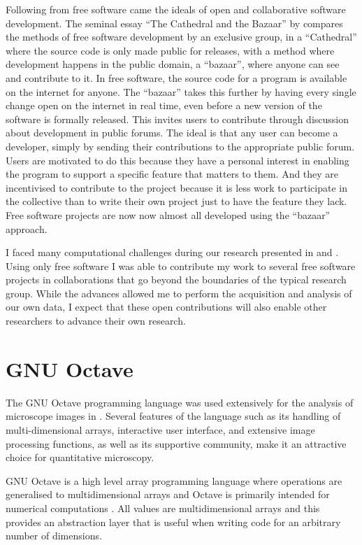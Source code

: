 Following from free software came the ideals of open and collaborative
software development.  The seminal essay ``The Cathedral and the
Bazaar'' by \citet{raymond1999-cathedral-and-bazaar} compares the
methods of free software development by an exclusive group, in a
``Cathedral'' where the source code is only made public for releases,
with a method where development
happens in the public domain, a ``bazaar'', where anyone can see
and contribute to it.
In free software, the source code for a program is available on the
internet for anyone.  The ``bazaar'' takes this further by having every
single change open on the internet in real time, even before a new version
of the software is formally released.  This invites users to contribute
through discussion about development in public forums.
The ideal is that any user can become a
developer, simply by sending their contributions to the appropriate public
forum.  Users are motivated to do this because they
have a personal interest in enabling the
program to support a specific feature that matters to them.  And they
are incentivised to contribute to the project because it is less work
to participate in the collective
than to write their own project just to have the feature
they lack.
Free software projects \citep{schindelin2012fiji, bioperl} are now
now almost all developed using the ``bazaar'' approach.

I faced many computational challenges
during our research presented in 
and .
Using only free software I was able to contribute my work to several
free software projects in collaborations that go beyond the
boundaries of the typical research group.  While the advances allowed
me to perform the acquisition and analysis of our own data,
I expect that these open contributions
will also enable other researchers to advance their own research.

\section{GNU Octave}

The GNU Octave programming language was used extensively for the analysis
of microscope images in .  Several features of the
language such as its handling of multi-dimensional arrays, interactive
user interface, and extensive image processing functions, as well as
its supportive community, make it an attractive choice
for quantitative microscopy.

GNU Octave is a high level array programming
language where operations are generalised to multidimensional arrays
and Octave is primarily intended for numerical computations \citep{octave}.
All values are multidimensional arrays and this provides
an abstraction layer that is useful when writing code for an arbitrary
number of dimensions.

